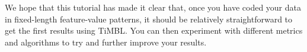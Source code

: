 \documentclass{report}
\begin{document}
We hope that this tutorial has made it clear that, once you have coded
your data in fixed-length feature-value patterns, it should be
relatively straightforward to get the first results using TiMBL. You
can then experiment with different metrics and algorithms to try and
further improve your results.
\end{document}
